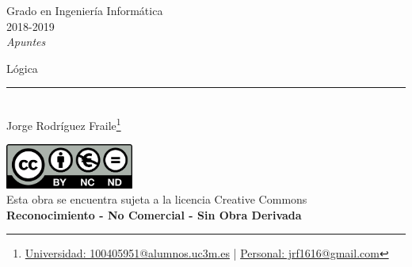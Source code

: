 \documentclass[12pt, twoside, openright]{report} %
\begin{document}
	
\begin{titlepage}
	\begin{sffamily}
	\color{azulUC3M}
	\begin{center}
		\begin{figure}[H] %
		\end{figure}
		\vspace{2.5cm}
		\begin{Large}
			Grado en Ingeniería Informática\\			
			2018-2019\\
			\vspace{2cm}		
			\textsl{Apuntes}\\
			\bigskip
		\end{Large}
		 	{\Huge Lógica}\\
		 	\vspace*{0.5cm}
	 		\rule{10.5cm}{0.1mm}\\
			\vspace*{0.9cm}
			{\LARGE Jorge Rodríguez Fraile\footnote{\href{mailto:100405951@alumnos.uc3m.es}{Universidad: 100405951@alumnos.uc3m.es}  |  \href{mailto:jrf1616@gmail.com}{Personal: jrf1616@gmail.com}}}\\ 
			\vspace*{1cm}
	\end{center}
	\vfill
	\color{black}
		\includegraphics[width=4.2cm]{img/creativecommons.png}\\
		Esta obra se encuentra sujeta a la licencia Creative Commons\\ \textbf{Reconocimiento - No Comercial - Sin Obra Derivada}
	\end{sffamily}
\end{titlepage}


\tableofcontents
\thispagestyle{fancy}
\end{document}
